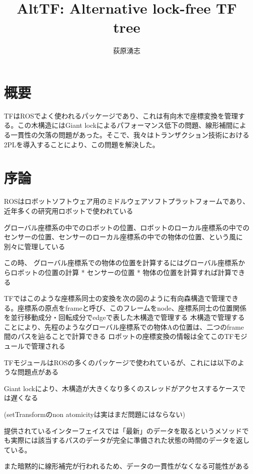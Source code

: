 \documentclass{article}
\title{AltTF: Alternative lock-free TF tree}
\author{荻原湧志}
\begin{document}
\begin{multicols}{2}

\maketitle

\section*{概要}
TFはROSでよく使われるパッケージであり、これは有向木で座標変換を管理する。この木構造にはGiant lockによるパフォーマンス低下の問題、線形補間による一貫性の欠落の問題があった。そこで、我々はトランザクション技術における2PLを導入することにより、この問題を解決した。

\section{序論}


ROSはロボットソフトウェア用のミドルウェアソフトプラットフォームであり、近年多くの研究用ロボットで使われている

グローバル座標系の中でのロボットの位置、ロボットのローカル座標系の中でのセンサーの位置、センサーのローカル座標系の中での物体の位置、という風に別々に管理している

この時、
グローバル座標系での物体の位置を計算するにはグローバル座標系からロボットの位置の計算 * センサーの位置 * 物体の位置を計算すれば計算できる

TFではこのような座標系同士の変換を次の図のように有向森構造で管理できる。座標系の原点をframeと呼び、このフレームをnode、座標系同士の位置関係を並行移動成分・回転成分でedgeで表した木構造で管理する
木構造で管理することにより、先程のようなグローバル座標系での物体Aの位置は、二つのframe間のパスを辿ることで計算できる
ロボットの座標変換の情報は全てこのTFモジュールで管理される

TFモジュールはROSの多くのパッケージで使われているが、これには以下のような問題点がある

Giant lockにより、木構造が大きくなり多くのスレッドがアクセスするケースでは遅くなる

(setTransformのnon atomicityは実はまだ問題にはならない)

提供されているインターフェイスでは「最新」のデータを取るというメソッドでも実際には該当するパスのデータが完全に準備された状態の時間のデータを返している。

また暗黙的に線形補完が行われるため、データの一貫性がなくなる可能性がある






\end{multicols}
\end{document}
